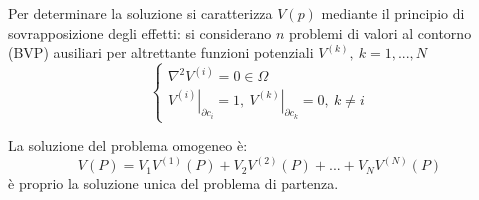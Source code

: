 Per determinare la soluzione si caratterizza $V(p)$ mediante il principio di sovrapposizione degli effetti:
si considerano $n$ problemi di valori al contorno (BVP) ausiliari per altrettante funzioni
potenziali $V^{(k)},\ k=1,...,N$
$$
\begin{cases}
\nabla^2 V^{(i)} = 0 \in \Omega \\
\left.V^{(i)}\right|_{\partial c_i} =  1,\ \left.V^{(k)}\right|_{\partial c_k} = 0,\ k \neq i
\end{cases}
$$

La soluzione del problema omogeneo è:
$$
V(P) = V_1 V^{(1)}(P) + V_2 V^{(2)}(P) + ... + V_NV^{(N)}(P)
$$
è proprio la soluzione unica del problema di partenza.
